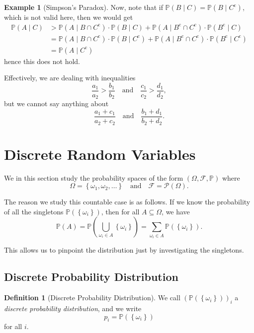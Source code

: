 \documentclass[11pt]{article}
\numberwithin{equation}{section}
\theoremstyle{definition}
\newtheorem{definition}[theorem]{Definition}
\newtheorem{example}[theorem]{Example}
\theoremstyle{remark}
\newcommand{\pqty}[1]{\left(#1\right)}
\newcommand{\Bqty}[1]{\left\{#1\right\}}
\newcommand{\qand}{\quad\text{and}\quad}
\newcommand{\compl}{^{\mathrm c}}
\newcommand{\powerset}{\mathcal P}
\newcommand{\eventSpace}{\mathcal F}
\newcommand{\Prob}{\mathbb P}
\newcommand{\Conditional}[2]{#1\mid #2}
\begin{document}
\begin{example}[Simpson's Paradox]
    Now, note that if \(\Prob\pqty{\Conditional{B}{C}} = \Prob\pqty{\Conditional{B}{C\compl}}\), which is not valid here, then we would get
    \begin{align*}
        \Prob\pqty{\Conditional{A}{C}} &> \Prob\pqty{\Conditional{A}{B \cap C\compl}} \cdot \Prob\pqty{\Conditional{B}{C}} + \Prob\pqty{\Conditional{A}{B\compl \cap C\compl}} \cdot \Prob \pqty{\Conditional{B\compl}{C}} \\
        &= \Prob\pqty{\Conditional{A}{B \cap C\compl}} \cdot \Prob\pqty{\Conditional{B}{C\compl}} + \Prob\pqty{\Conditional{A}{B\compl \cap C\compl}} \cdot \Prob \pqty{\Conditional{B\compl}{C\compl}} \\
        &= \Prob\pqty{\Conditional{A}{C\compl}}
    \end{align*}
    hence this does not hold.

    Effectively, we are dealing with inequalities
    \[
        \frac{a_1}{a_2} > \frac{b_1}{b_2} \qand \frac{c_1}{c_2} > \frac{d_1}{d_2},
    \]
    but we cannot say anything about
    \[
        \frac{a_1 + c_1}{a_2 + c_2} \qand \frac{b_1 + d_1}{b_2 + d_2}.
    \]
\end{example}

\section{Discrete Random Variables}\label{probability-section-04}

We in this section study the probability spaces of the form \(\pqty{\Omega, \eventSpace, \Prob}\) where
\[
    \Omega = \Bqty{\omega_1, \omega_2, \ldots} \qand \eventSpace = \powerset\pqty{\Omega}.
\]

The reason we study this countable case is as follows. If we know the probability of all the singletons \(\Prob\pqty{\Bqty{\omega_i}}\), then for all \(A \subseteq \Omega\), we have
\[
    \Prob\pqty{A} = \Prob\pqty{\bigcup_{\omega_i \in A} \Bqty{\omega_i}} = \sum_{\omega_i \in A} \Prob\pqty{\Bqty{\omega_i}}.
\]

This allows us to pinpoint the distribution just by investigating the singletons.

\subsection{Discrete Probability Distribution}

\begin{definition}[Discrete Probability Distribution]\label{probability-definition-010}
    \label{probability-def:discrete-probability-distribution}%
    We call \(\pqty{\Prob\pqty{\Bqty{\omega_i}}}_i\) a \emph{discrete probability distribution}, and we write
    \[
        p_i = \Prob\pqty{\Bqty{\omega_i}}
    \]
    for all \(i\).
\end{definition}
\end{document}
